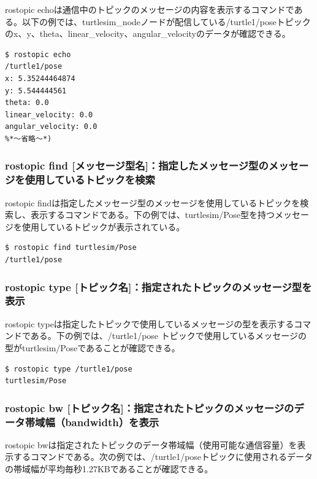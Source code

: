 rostopic echoは通信中のトピックのメッセージの内容を表示するコマンドである。以下の例では、turtlesim\_nodeノードが配信している/turtle1/poseトピックのx、y、theta、linear\_velocity、angular\_velocityのデータが確認できる。

\begin{lstlisting}[language=ROS]
$ rostopic echo
/turtle1/pose
x: 5.35244464874
y: 5.544444561
theta: 0.0
linear_velocity: 0.0
angular_velocity: 0.0
%*〜省略〜*)
\end{lstlisting}

\subsubsection{rostopic find [メッセージ型名]：指定したメッセージ型のメッセージを使用しているトピックを検索}

rostopic findは指定したメッセージ型のメッセージを使用しているトピックを検索し、表示するコマンドである。下の例では、turtlesim/Pose型を持つメッセージを使用しているトピックが表示されている。

\begin{lstlisting}[language=ROS]
$ rostopic find turtlesim/Pose
/turtle1/pose
\end{lstlisting}

\subsubsection{rostopic type [トピック名]：指定されたトピックのメッセージ型を表示}

rostopic typeは指定したトピックで使用しているメッセージの型を表示するコマンドである。下の例では、/turtle1/pose トピックで使用しているメッセージの型がturtlesim/Poseであることが確認できる。

\begin{lstlisting}[language=ROS]
$ rostopic type /turtle1/pose
turtlesim/Pose
\end{lstlisting}

\subsubsection{rostopic bw [トピック名]：指定されたトピックのメッセージのデータ帯域幅（bandwidth）を表示}

rostopic bwは指定されたトピックのデータ帯域幅（使用可能な通信容量）を表示するコマンドである。次の例では、/turtle1/poseトピックに使用されるデータの帯域幅が平均毎秒1.27KBであることが確認できる。

